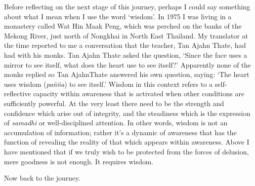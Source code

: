 Before reflecting on the next stage of this journey, perhaps I could say
something about what I mean when I use the word `wisdom'. In 1975 I was
living in a monastery called Wat Hin Maak Peng, which was perched on the
banks of the Mekong River, just north of Nongkhai in North East
Thailand. My translator at the time reported to me a conversation that
the teacher, Tan Ajahn Thate, had had with his monks. Tan Ajahn Thate
asked the question, `Since the face uses a mirror to see itself, what
does the heart use to see itself?' Apparently none of the monks replied
so Tan AjahnThate answered his own question, saying: `The heart uses
wisdom (\emph{pañña}) to see itself.' Wisdom in this context refers to a
self-reflective capacity within awareness that is activated when other
conditions are sufficiently powerful. At the very least there need to be
the strength and confidence which arise out of integrity, and the
steadiness which is the expression of \emph{samadhi} or well-disciplined
attention. In other words, wisdom is not an accumulation of information;
rather it's a dynamic of awareness that has the function of revealing
the reality of that which appears within awareness. Above I have
mentioned that if we truly wish to be protected from the forces of
delusion, mere goodness is not enough. It requires wisdom.

Now back to the journey.

